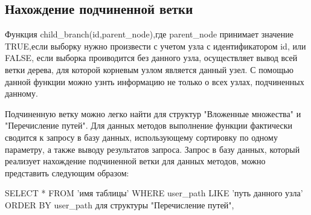 \documentclass[a4paper,14pt]{extreport}
\theoremstyle{definition}
\begin{document}
\begin{table}[H]
\end{table}
\subsection{Нахождение подчиненной ветки}
Функция child\_branch(\textdollar id,\textdollar parent\_node),где \textdollar parent\_node принимает значение TRUE,если выборку нужно произвести с учетом узла с идентификатором \textdollar id, или FALSE, если выборка проиводится без данного узла, осуществляет вывод всей ветки дерева, для которой корневым узлом является данный узел. С помощью данной функции можно узнть информацию не только о всех узлах, подчиненных данному.

Подчиненную ветку можно легко найти для структур "Вложенные множества" и "Перечисление путей". Для данных методов выполнение функции фактически сводится к запросу в базу данных, использующему сортировку по одному параметру, а также выводу результатов запроса.
Запрос в базу данных, который реализует нахождение подчиненной ветки для данных методов, можно представить следующим образом:

SELECT * FROM 'имя таблицы' WHERE user\_path LIKE 'путь данного узла' ORDER BY user\_path для структуры "Перечисление путей",
\end{document}
